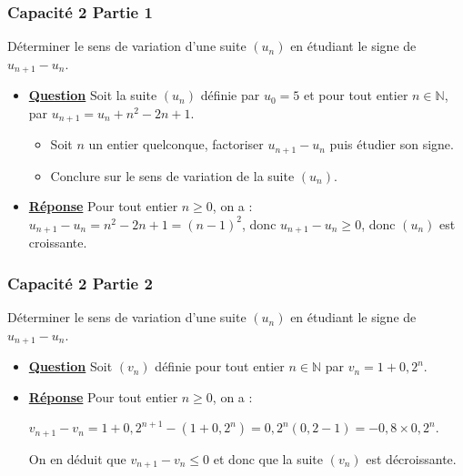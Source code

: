 \documentclass[11pt, hyperref={urlcolor=red,%
            linkcolor=blue, %
            colorlinks=true}]{beamer}
\newcommand{\N}{\mathbb{N}}
\newcommand{\suite}[1]{\ensuremath{\left(#1_{n}\right)}}
\begin{document}
\begin{frame}
\frametitle{Capacité 2 Partie 1}
\label{capacite2}

Déterminer le sens de variation d'une suite $\suite{u}$ en étudiant le signe de $u_{n+1}-u_{n}$.

\begin{itemize}
	\item \underline{\textbf{Question}}  Soit la suite \suite{u} définie par $u_{0}=5$ et pour tout entier $n \in \N$, par $u_{n+1}=u_{n}+n^2-2n+1$.
    \begin{itemize}
      \item Soit $n$ un entier quelconque, factoriser  $u_{n+1}-u_{n}$ puis étudier son signe.
      \item Conclure sur le sens de variation de la suite \suite{u}.
    \end{itemize}
	
	
\pause 	\item \underline{\textbf{Réponse}} Pour tout entier $n \geqslant 0$, on a : $u_{n+1}-u_{n}=n^2-2n+1=(n-1)^{2}$, donc $u_{n+1}-u_{n} \geqslant 0$, donc $\suite{u}$ est croissante.



\end{itemize}


\end{frame}



\begin{frame}
\frametitle{Capacité 2 Partie 2}

Déterminer le sens de variation d'une suite $\suite{u}$ en étudiant le signe de $u_{n+1}-u_{n}$.

\begin{itemize}
	\item  \underline{\textbf{Question}}  Soit $\suite{v}$ définie pour tout entier $n \in \N$ par $v_{n}=1+0,2^n$.

	
\pause 	\item \underline{\textbf{Réponse}} Pour tout entier $n \geqslant 0$, on a : 

$v_{n+1}-v_{n}=1+0,2^{n+1}-(1+0,2^{n})=0,2^{n}(0,2-1)=-0,8\times 0,2^{n}$.

On en déduit que $v_{n+1}-v_{n} \leqslant 0$ et donc que la suite $\suite{v}$ est décroissante.



\end{itemize}


\end{frame}
\end{document}
